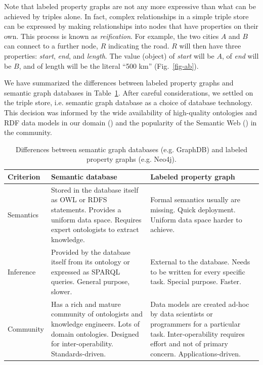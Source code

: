 Note that labeled property graphs are not any more expressive than what can be achieved by triples alone. In fact, complex relationships in a simple triple store can be expressed by making relationships into nodes that have properties on their own. This process is known as \emph{reification}. For example, the two cities $A$ and $B$ can connect to a further node, $R$ indicating the road. $R$ will then have three properties: \emph{start}, \emph{end}, and \emph{length}. The value (object) of \emph{start} will be $A$, of \emph{end} will be $B$, and of length will be the literal ``500 km'' (Fig.~\ref{fig-ab}).

We have summarized the differences between labeled property graphs and semantic graph databases in Table~\ref{graphdb-vs-neo4k}. After careful considerations, we settled on the triple store, i.e. semantic graph database as a choice of database technology. This decision was informed by the wide availability of high-quality ontologies and RDF data models in our domain (\cite{baskauf_darwin-sw:_2016,peroni_semantic_2014}) and the popularity of the Semantic Web (\cite{berners-lee_semantic_2001}) in the community. 

\begin{table}
\caption{Differences between semantic graph databases (e.g. GraphDB) and labeled property graphs (e.g. Neo4j).}
\begin{tabular}{>{\centering\arraybackslash}m{2.5cm}|>{\centering\arraybackslash}m{4.2cm}|>{\centering\arraybackslash}m{4.2cm}}
Criterion   & Semantic database & Labeled property graph\\
\hline
Semantics   & Stored in the database itself as OWL or RDFS statements. Provides a uniform data space. Requires expert ontologists to extract knowledge.
            & Formal semantics usually are missing. Quick deployment. Uniform data space harder to achieve.\\
\hline
Inference   & Provided by the database itself from its ontology or expressed as SPARQL queries. General purpose, slower.
            & External to the database. Needs to be written for every specific task. Special purpose. Faster.\\
\hline
Community   & Has a rich and mature community of ontologists and knowledge engineers. Lots of domain ontologies. Designed for inter-operability. Standards-driven.
            & Data models are created ad-hoc by data scientists or programmers for a particular task. Inter-operability requires effort and not of primary concern. Applications-driven.\\
\hline
\end{tabular}
\label{graphdb-vs-neo4k}
\end{table}

